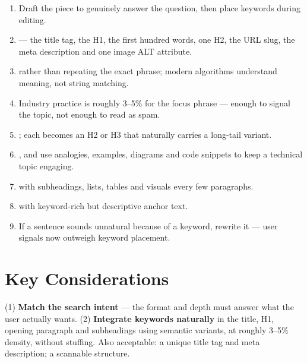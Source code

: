 \begin{enumerate}
\item {} Draft the piece to
      genuinely answer the question, then place keywords during editing.
\item {} --- the title
      tag, the H1, the first hundred words, one H2, the URL slug, the meta
      description and one image ALT attribute.
\item {} rather than repeating the exact
      phrase; modern algorithms understand meaning, not string matching.
\item {} Industry practice is roughly 3--5\% for the
      focus phrase --- enough to signal the topic, not enough to read as spam.
\item {}; each
      becomes an H2 or H3 that naturally carries a long-tail variant.
\item {}, and use analogies, examples, diagrams
      and code snippets to keep a technical topic engaging.
\item {} with subheadings, lists, tables and visuals every
      few paragraphs.
\item {} with keyword-rich but descriptive anchor text.
\item {} If a sentence sounds unnatural because of a keyword,
      rewrite it --- user signals now outweigh keyword placement.
\end{enumerate}

\section{Key Considerations}

\begin{exambox}
(1) \textbf{Match the search intent} --- the format and depth must answer what
the user actually wants. (2) \textbf{Integrate keywords naturally} in the title,
H1, opening paragraph and subheadings using semantic variants, at roughly 3--5\%
density, without stuffing. Also acceptable: a unique title tag and meta
description; a scannable structure.
\end{exambox}

